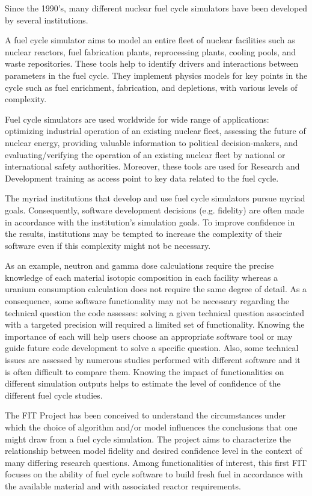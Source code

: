 Since the 1990's, many different nuclear fuel cycle simulators have been
developed by several institutions.

A fuel cycle simulator aims to model an entire fleet of nuclear 
facilities such as nuclear reactors, fuel fabrication plants, reprocessing
plants, cooling pools, and waste repositories. These tools help to identify drivers
and interactions between parameters in the fuel cycle. They implement physics models
for key points in the cycle such as fuel enrichment, fabrication, and
depletions, with various levels of complexity. 

Fuel cycle simulators are used worldwide for wide range of applications:
optimizing industrial operation of an existing nuclear fleet, assessing
the future of nuclear energy, providing valuable information to political 
decision-makers, and evaluating/verifying the operation of an existing
nuclear fleet by national or international safety authorities. Moreover, these
tools are used for Research and Development training as access point to key
data related to the fuel cycle.

The myriad institutions that develop and use fuel cycle simulators pursue myriad
goals. Consequently, software development decisions (e.g. fidelity) are often 
made in accordance with the institution's simulation goals. To improve
confidence in the results, institutions may be tempted to increase the complexity
of their software even if this complexity might not be necessary.

As an example, neutron and gamma dose calculations require the precise
knowledge of each material isotopic composition in each facility whereas a
uranium consumption calculation does not require the same degree of detail. As a
consequence, some software functionality may not be necessary regarding the
technical question the code assesses: solving a given technical question
associated with a targeted precision will required a limited set of
functionality. Knowing the importance of each will help users choose an
appropriate software tool or may guide future code development to solve a specific
question. Also, some technical issues are assessed by numerous studies performed
with different software and it is often difficult to compare them. Knowing the
impact of functionalities on different simulation outputs helps to estimate the
level of confidence of the different fuel cycle studies.

The \gls{FIT} Project has been conceived to understand
the circumstances under which the choice of algorithm and/or model influences
the conclusions that one might draw from a fuel cycle simulation. The
project aims to characterize the relationship between model fidelity and desired 
confidence level in the context of many differing research questions.
Among functionalities of interest, this first \gls{FIT} focuses on the ability of
fuel cycle software to build fresh fuel in accordance with the available material 
and with associated reactor requirements.


